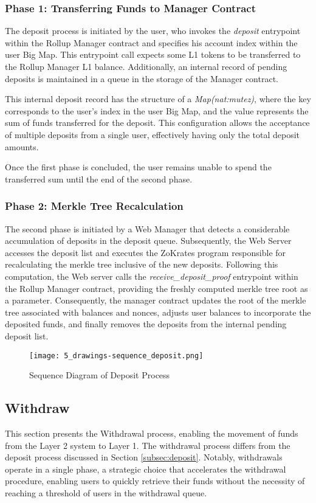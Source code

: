 \subsubsection{Phase 1: Transferring Funds to Manager Contract}
The deposit process is initiated by the user, who invokes the \textit{deposit} entrypoint within the Rollup Manager contract and specifies his account index within the user Big Map. This entrypoint call expects some L1 tokens to be transferred to the Rollup Manager L1 balance. Additionally, an internal record of pending deposits is maintained in a queue in the storage of the Manager contract.

This internal deposit record has the structure of a \textit{Map(nat:mutez)}, where the key corresponds to the user's index in the user Big Map, and the value represents the sum of funds transferred for the deposit. This configuration allows the acceptance of multiple deposits from a single user, effectively having only the total deposit amounts.

Once the first phase is concluded, the user remains unable to spend the transferred sum until the end of the second phase.

\subsubsection{Phase 2: Merkle Tree Recalculation}
The second phase is initiated by a Web Manager that detects a considerable accumulation of deposits in the deposit queue. Subsequently, the Web Server accesses the deposit list and executes the ZoKrates program responsible for recalculating the merkle tree inclusive of the new deposits. Following this computation, the Web server calls the \textit{receive\_deposit\_proof} entrypoint within the Rollup Manager contract, providing the freshly computed merkle tree root as a parameter. Consequently, the manager contract updates the root of the merkle tree associated with balances and nonces, adjusts user balances to incorporate the deposited funds, and finally removes the deposits from the internal pending deposit list.

\begin{figure}[ht]
	\centering
	\texttt{[image: 5\_drawings-sequence\_deposit.png]}
	\caption[Sequence Deposit]{Sequence Diagram of Deposit Process}
	\label{fig:5_drawings-sequence_deposit.png}
\end{figure}

\subsection{Withdraw}
This section presents the Withdrawal process, enabling the movement of funds from the Layer 2 system to Layer 1. The withdrawal process differs from the deposit process discussed  in Section \ref{subsec:deposit}. Notably, withdrawals operate in a single phase, a strategic choice that accelerates the withdrawal procedure, enabling users to quickly retrieve their funds without the necessity of reaching a threshold of users in the withdrawal queue.

